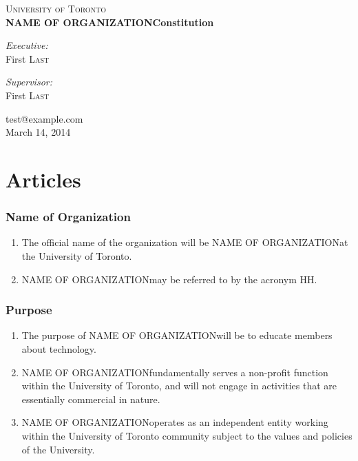 \documentclass[12pt]{article}
\makeatletter
\newcommand{\orgname}{NAME OF ORGANIZATION\space}
\newcommand{\orgemail}{test@example.com}
\newcommand{\creationdate}{March 14, 2014}
\makeatother
\begin{document}

\begin{titlepage}
\begin{center}

\textsc{\LARGE University of Toronto}\\[3.0cm]

{ \huge \bfseries \orgname Constitution\\[1.0cm] }

\begin{minipage}{0.4\textwidth}
\begin{flushleft} \large
\emph{Executive:}\\
First \textsc{Last}
\end{flushleft}
\end{minipage}
\begin{minipage}{0.4\textwidth}
\begin{flushright} \large
\emph{Supervisor:} \\
First \textsc{Last}
\end{flushright}
\end{minipage}

\vfill

{\orgemail}\\
{\creationdate}
\end{center}
\end{titlepage}


\part{Articles}

\section{Name of Organization}
\begin{enumerate}[{1}.1]
    \item The official name of the organization will be \orgname at the University of Toronto.
    \item \orgname may be referred to by the acronym HH.
\end{enumerate}


\section{Purpose}
\begin{enumerate}[{2}.1]
    \item	The purpose of \orgname will be to educate members about technology.
    \item	\orgname fundamentally serves a non-profit function within the University of Toronto, and will not engage in activities that are essentially commercial in nature. 
    \item	\orgname operates as an independent entity working within the University of Toronto community subject to the values and policies of the University.  
\end{enumerate}
\end{document}
